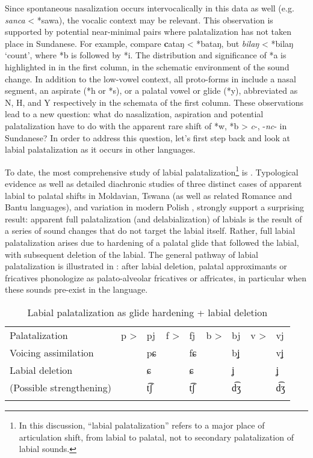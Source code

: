 \documentclass[output=paper]{langscibook}
\begin{document}
Since spontaneous nasalization occurs intervocalically in this data as well (e.g. \textit{sanca} < *sawa), the vocalic context may be relevant. This observation is supported by potential near-minimal pairs where palatalization has not taken place in Sundanese. For example, compare \textbf{c}ataŋ < *bataŋ, but \textit{bilaŋ} < *bilaŋ ‘count’, where *b is followed by *i. The distribution and significance of *a is highlighted in  in the first column, in the schematic environment of the sound change. In addition to the low-vowel context, all proto-forms in  include a nasal segment, an aspirate (*h or *s), or a palatal vowel or glide (*y), abbreviated as N, H, and Y respectively in the schemata of the first column. These observations lead to a new question: what do nasalization, aspiration and potential palatalization have to do with the apparent rare shift of  *w, *b > \textit{c}-, -\textit{nc}- in Sundanese? In order to address this question, let’s first step back and look at labial palatalization as it occurs in other languages.

To date, the most comprehensive study of labial palatalization\footnote{In this discussion, “labial palatalization” refers to a major place of articulation shift, from labial to palatal, not to secondary palatalization of labial sounds.} is \citet{Bateman2010}. Typological evidence as well as detailed diachronic studies of three distinct cases of apparent labial to palatal shifts in Moldavian, Tswana (as well as related Romance and Bantu languages), and variation in modern Polish \citep{Kochetov1998}, strongly support a surprising result: apparent full palatalization (and delabialization) of labials is the result of a series of sound changes that do not target the labial itself. Rather, full labial palatalization arises due to hardening of a palatal glide that followed the labial, with subsequent deletion of the labial. The general pathway of labial palatalization is illustrated in : after labial deletion, palatal approximants or fricatives phonologize as palato-alveolar fricatives or affricates, in particular when these sounds pre-exist in the language.

\begin{table}%
\caption{Labial palatalization as glide hardening + labial deletion \citep{Bateman2010}}
\label{tab:ex:blevins:17}
\begin{tabularx}{\textwidth}{l lX lX lX ll }
\lsptoprule
  Palatalization           & p > & pj  & f > & fj  & b > & bj  & v > & vj\\
  Voicing assimilation     &     & pɕ  &     & fɕ  &     & bʝ  &     & vʝ\\
  Labial deletion          &     & ɕ   &     & ɕ   &     & ʝ   &     & ʝ \\
  (Possible strengthening) &     & t͡ʃ  &     & t͡ʃ  &     & d͡ʒ  &     & d͡ʒ\\
\lspbottomrule
\end{tabularx}
\end{table}
\end{document}
